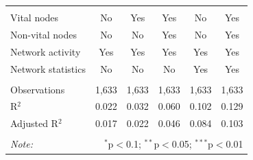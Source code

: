 \begin{table}[!htbp]
\begin{tabular}{@{\extracolsep{5pt}}lccccc}
\hline \\[-1.8ex] 
Vital nodes & No & Yes & Yes & No & Yes \\ 
Non-vital nodes & No & No & Yes & No & Yes \\ 
Network activity & Yes & Yes & Yes & Yes & Yes \\ 
Network statistics & No & No & No & Yes & Yes \\ 
\hline &  &  &  &  &  \\ 
Observations & 1,633 & 1,633 & 1,633 & 1,633 & 1,633 \\ 
R$^{2}$ & 0.022 & 0.032 & 0.060 & 0.102 & 0.129 \\ 
Adjusted R$^{2}$ & 0.017 & 0.022 & 0.046 & 0.084 & 0.103 \\ 
\hline 
\hline \\[-1.8ex] 
\textit{Note:}  & \multicolumn{5}{r}{$^{*}$p$<$0.1; $^{**}$p$<$0.05; $^{***}$p$<$0.01} \\ 
\end{tabular} 
\end{table} 
